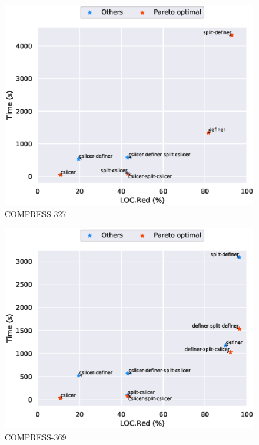 \begin{figure}
\includegraphics[scale=0.7]{plots/pareto/COMPRESS-327-pareto}
\caption{COMPRESS-327}
\end{figure}
\begin{figure}
\includegraphics[scale=0.7]{plots/pareto/COMPRESS-369-pareto}
\caption{COMPRESS-369}
\end{figure}
